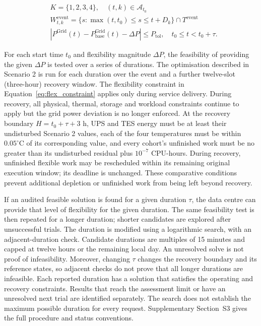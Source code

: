 \documentclass[lettersize,journal]{IEEEtran}
\newcommand{\rev}[1]{#1}
\begin{document}
\begin{align}
& K=\{1,2,3,4\},\quad (t,k)\in\mathcal A_{t_0} \label{eq:k_def} \\
& W^{\mathrm{event}}_{t,k}=\{s:\max(t,t_0)\leq s\leq t+D_k\}\cap T^{\mathrm{event}} \label{eq:Dk_def} \\
& \left|P^{\mathrm{Grid}}(t)-P^{\mathrm{Grid}}_{\mathrm{base}}(t)-\Delta P\right|\leq P_{\mathrm{tol}},\quad t_0\leq t<t_0+\tau. \label{eq:flex_constraint}
\end{align}

For each start time $t_0$ and flexibility magnitude $\Delta P$, the feasibility of providing the given $\Delta P$ is tested over a series of durations. \rev{The optimisation described in Scenario 2 is run for each duration over the event and a further twelve-slot (three-hour) recovery window. The flexibility constraint in Equation~\eqref{eq:flex_constraint} applies only during service delivery. During recovery, all physical, thermal, storage and workload constraints continue to apply but the grid power deviation is no longer enforced.} At the recovery boundary $H=t_0+\tau+3$ h, UPS and TES energy must be at least their undisturbed Scenario 2 values, each of the four temperatures must be within $0.05^\circ$C of its corresponding value, and every cohort's unfinished work must be no greater than its undisturbed residual plus $10^{-7}$ CPU-hours. During recovery, unfinished flexible work may be rescheduled within its remaining original execution window; its deadline is unchanged. These comparative conditions prevent additional depletion or unfinished work from being left beyond recovery.

If an audited feasible solution is found for a given duration $\tau$, the data centre can provide that level of flexibility for the given duration. The same feasibility test is then repeated for a longer duration; shorter candidates are explored after unsuccessful trials. The duration is modified using a logarithmic search, with an adjacent-duration check. Candidate durations are multiples of 15 minutes and capped at twelve hours or the remaining local day. An unresolved solve is not proof of infeasibility. Moreover, changing $\tau$ changes the recovery boundary and its reference states, so adjacent checks do not prove that all longer durations are infeasible. Each reported duration has a solution that satisfies the operating and recovery constraints. Results that reach the assessment limit or have an unresolved next trial are identified separately. The search does not establish the maximum possible duration for every request. Supplementary Section~S3 gives the full procedure and status conventions.
\end{document}

